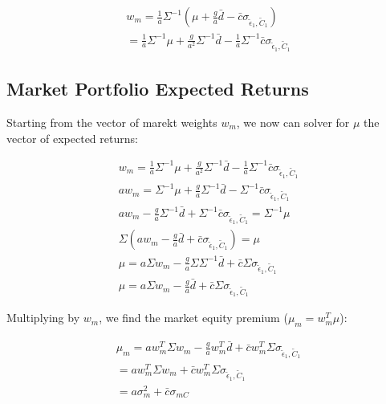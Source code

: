\begin{equation}
    \begin{aligned}
    w_m = \frac{1}{a} \Sigma^{-1} (\mu + \frac{g}{a} \bar{d} - \bar{c} \sigma_{\tilde{\epsilon}_1, \tilde{C}_1}) \\
    = \frac{1}{a} \Sigma^{-1} \mu + \frac{g}{a^2} \Sigma^{-1} \bar{d} - \frac{1}{a} \Sigma^{-1} \bar{c} \sigma_{\tilde{\epsilon}_1, \tilde{C}_1}
    \end{aligned}
\end{equation}

\subsection{Market Portfolio Expected Returns}

Starting from the vector of marekt weights $w_m$, we now 
can solver for $\mu$ the vector of expected returns:


\begin{equation}
    \begin{aligned}
        w_m = \frac{1}{a} \Sigma^{-1} \mu + \frac{g}{a^2} \Sigma^{-1} \bar{d} - \frac{1}{a} \Sigma^{-1} \bar{c} \sigma_{\tilde{\epsilon}_1, \tilde{C}_1} \\
        aw_m = \Sigma^{-1} \mu + \frac{g}{a} \Sigma^{-1} \bar{d} - \Sigma^{-1} \bar{c} \sigma_{\tilde{\epsilon}_1, \tilde{C}_1} \\
        aw_m - \frac{g}{a} \Sigma^{-1} \bar{d} + \Sigma^{-1} \bar{c} \sigma_{\tilde{\epsilon}_1, \tilde{C}_1} = \Sigma^{-1} \mu \\
        \Sigma(aw_m - \frac{g}{a} \bar{d} + \bar{c} \sigma_{\tilde{\epsilon}_1, \tilde{C}_1}) = \mu \\
        \mu = a\Sigma w_m - \frac{g}{a} \Sigma \Sigma^{-1} \bar{d} + \bar{c} \Sigma \sigma_{\tilde{\epsilon}_1, \tilde{C}_1} \\
        \mu = a\Sigma w_m - \frac{g}{a} \bar{d} + \bar{c} \Sigma \sigma_{\tilde{\epsilon}_1, \tilde{C}_1}
    \end{aligned}
\end{equation}

Multiplying by $w_m$, we find the market equity premium ($\mu_m = w_m^T \mu$):

\begin{equation}
    \begin{aligned}
    \mu_m = a w_m^T \Sigma w_m - \frac{g}{a} w_m^T \bar{d} + \bar{c} w_m^T \Sigma \sigma_{\tilde{\epsilon}_1, \tilde{C}_1} \\
    = a w_m^T \Sigma w_m + \bar{c} w_m^T \Sigma \sigma_{\tilde{\epsilon}_1, \tilde{C}_1} \\
    = a \sigma^2_m + \bar{c} \sigma_{mC}
    \end{aligned}
\end{equation}

